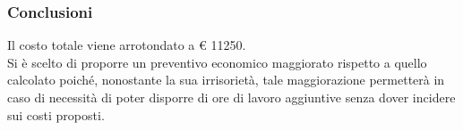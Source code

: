 		\subsubsection{Conclusioni}
		Il costo totale viene arrotondato a € 11250. \\
		Si è scelto di proporre un preventivo economico maggiorato rispetto a quello calcolato poiché, nonostante la sua irrisorietà, tale maggiorazione permetterà in caso di necessità di poter disporre di ore di lavoro aggiuntive senza dover incidere sui costi proposti.